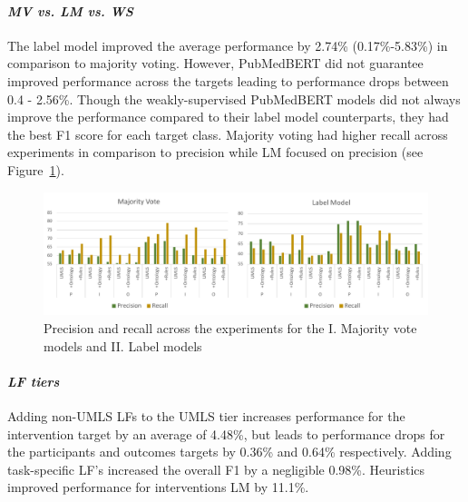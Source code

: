 \documentclass[10.7pt,]{article}
\let\oldparagraph\paragraph
\renewcommand{\paragraph}[1]{\oldparagraph{#1}\mbox{}}
\begin{document}
\paragraph{\textit{MV vs. LM vs. WS}}
The label model improved the average performance by 2.74\% (0.17\%-5.83\%) in comparison to majority voting.
However, PubMedBERT did not guarantee improved performance across the targets leading to performance drops between 0.4 - 2.56\%.
Though the weakly-supervised PubMedBERT models did not always improve the performance compared to their label model counterparts, they had the best F1 score for each target class.
Majority voting had higher recall across experiments in comparison to precision while LM focused on precision (see Figure~\ref{fig:precRecall}).
%
\begin{figure}
    \centering
    \includegraphics{figures/precRecall.pdf}
    \caption{Precision and recall across the experiments for the I. Majority vote models and II. Label models}
    \label{fig:precRecall}
\end{figure}

\paragraph{\textit{LF tiers}}
Adding non-UMLS LFs to the UMLS tier increases performance for the intervention target by an average of 4.48\%, but leads to performance drops for the participants and outcomes targets by 0.36\% and 0.64\% respectively.
Adding task-specific LF's increased the overall F1 by a negligible 0.98\%.
Heuristics improved performance for interventions LM by 11.1\%.
%
\end{document}

